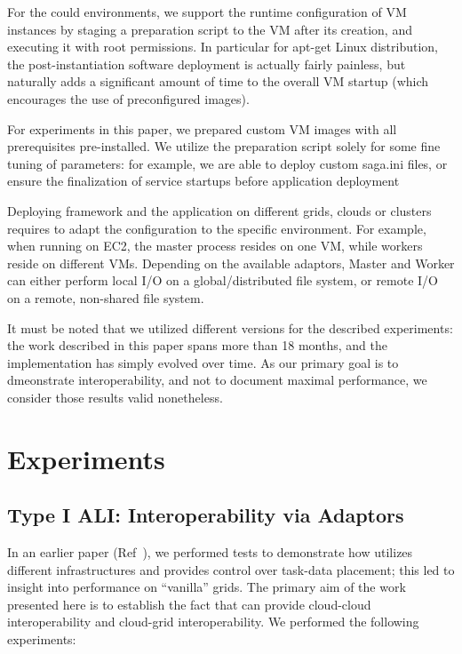 \documentclass[3p,twocolumn]{elsarticle}
\begin{document}
For the could environments, we support the runtime configuration of VM
instances by staging a preparation script to the VM after its
creation, and executing it with root permissions.  In particular for
apt-get Linux distribution, the post-instantiation software deployment
is actually fairly painless, but naturally adds a significant amount
of time to the overall VM startup (which encourages the use of
preconfigured images).

For experiments in this paper, we prepared custom VM images with all
prerequisites pre-installed.  We utilize the preparation script solely
for some fine tuning of parameters: for example, we are able to deploy
custom saga.ini files, or ensure the finalization of service startups
before application deployment

Deploying \sagamapreduce framework and the \wc application on
different grids, clouds or clusters requires to adapt the configuration
to the specific environment.  For example, when running \sagamapreduce
on EC2, the master process resides on one VM, while workers reside on
different VMs.  Depending on the available adaptors, Master and Worker
can either perform local I/O on a global/distributed file system, or
remote I/O on a remote, non-shared file system.

It must be noted that we utilized different \smr versions for the
described experiments: the work described in this paper spans more
than 18 months, and the \smr implementation has simply evolved over
time.  As our primary goal is to dmeonstrate interoperability, and not
to document maximal performance, we consider those results valid
nonetheless.


\section{Experiments} 
\label{sec:exp}

\subsection{Type I ALI: Interoperability via Adaptors}

In an earlier paper (Ref~\cite{saga_ccgrid09}), we performed tests to
demonstrate how \sagamapreduce utilizes different infrastructures and
provides control over task-data placement; this led to insight into
performance on ``vanilla'' grids.  The primary aim of the work
presented here is to establish the fact that \sagamapreduce can
provide cloud-cloud interoperability and cloud-grid interoperability.
We performed the following experiments:
\end{document}
